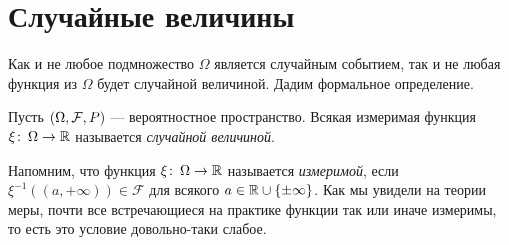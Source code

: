 \documentclass[../main.tex]{subfiles}
\begin{document}
\section{Случайные величины}

Как и не любое подмножество $ \Omega $ является случайным событием, так и не любая функция из $ \Omega $ будет случайной величиной. Дадим формальное определение.

\begin{df}
 Пусть $(\Omega, \mathcal F, P)$ --- вероятностное пространство. Всякая измеримая функция $\xi \colon\, \Omega \to \mathbb{R}$ называется \textit{случайной величиной}.
\end{df}

Напомним, что функция $ \xi \colon\, \Omega \to \mathbb{R} $ называется \textit{измеримой}, если $ \xi^{-1}((a, +\infty)) \in \mathcal F $ для всякого $ a \in \mathbb{R} \cup \{\pm \infty\} $. Как мы увидели на теории меры, почти все  встречающиеся на практике функции так или иначе измеримы, то есть это условие довольно-таки слабое.
\end{document}
